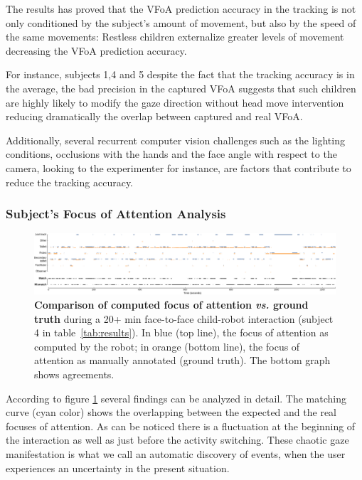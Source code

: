 \documentclass{sig-alternate}
\newcommand{\vs}{\textit{vs.}\xspace}
\begin{document}
The results has proved that the VFoA prediction accuracy in the tracking is not
only conditioned by the subject's amount of movement, but also by the speed of
the same movements: Restless children externalize greater levels of movement
decreasing the VFoA prediction accuracy. 

For instance, subjects 1,4 and 5 despite the fact that the tracking accuracy is
in the average, the bad precision in the captured VFoA suggests that such
children are highly likely to modify the gaze direction without head move
intervention reducing dramatically the overlap between captured and real VFoA.

Additionally, several recurrent computer vision challenges such as the lighting
conditions, occlusions with the hands and the face angle with respect to the
camera, looking to the experimenter for instance, are factors that contribute to
reduce the tracking accuracy.

\subsubsection{Subject's Focus of Attention Analysis}

\begin{figure}
    \centering
    \includegraphics[width=\linewidth]{matches}
    \caption{\small \textbf{Comparison of computed focus of attention \vs ground
        truth} during a 20+ min face-to-face child-robot interaction (subject 4
        in table~\ref{tab:results}).
        In blue (top line), the focus of attention as computed by the robot;
        in orange (bottom line), the focus of attention as manually annotated
        (ground truth). The bottom graph shows agreements.}

    \label{fig:realExpected}
    
\end{figure}

According to figure \ref{fig:realExpected} several findings can be analyzed in
detail. The matching curve (cyan color) shows the overlapping between the
expected and the real focuses of attention. As can be noticed there is a
fluctuation at the beginning of the interaction as well as just before the
activity switching. These chaotic gaze manifestation is what we call an
automatic discovery of events, when the user experiences an uncertainty in the
present situation. 
\end{document}
